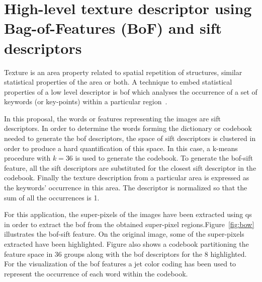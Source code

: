 \documentclass[a4paper, 10pt, conference]{llncs}      %
\begin{document}


\vspace{-10pt}
\section{High-level texture descriptor using Bag-of-Features (BoF) and \ac{sift} descriptors}%
Texture is an area property related to spatial repetition of structures, similar statistical properties of the area or both. A technique to embed statistical properties of a low level descriptor is \ac{bof} which analyses the occurrence of a set of keywords (or key-points) within a particular region~\cite{csurka2004visual}. 

In this proposal, the words or features representing the images are \ac{sift} descriptors. In order to determine the words forming the dictionary or codebook needed to generate the \ac{bof} descriptors, the space of \ac{sift} descriptors is clustered in order to produce a hard quantification of this space. In this case, a k-means procedure with $k=36$ is used to generate the codebook. To generate the \ac{bof}-\ac{sift} feature, all the \ac{sift} descriptors are substituted for the closest \ac{sift} descriptor in the codebook. Finally the texture description from a particular area is expressed as the keywords' occurrence in this area. The descriptor is normalized so that the sum of all the occurrences is 1. 

For this application, the super-pixels of the images have been extracted using \ac{qs}%
in order to extract the \ac{bof} from the obtained super-pixel regions.Figure~\ref{fig:bow} illustrates the \ac{bof}-\ac{sift} feature. On the original image, some of the super-pixels extracted have been highlighted. Figure also shows a codebook partitioning the feature space in 36 groups along with the \ac{bof} descriptors for the 8 highlighted. For the visualization of the \ac{bof} features a jet color coding has been used to represent the occurrence of each word within the codebook.




\end{document}
